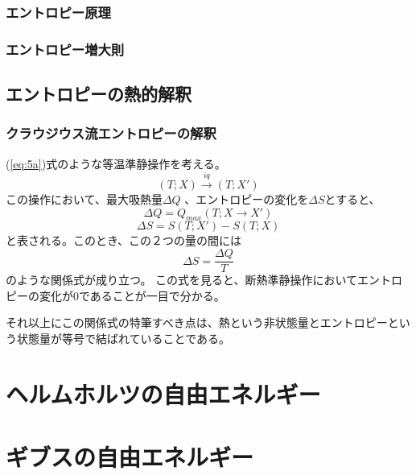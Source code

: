 \documentclass[a4paper]{jsreport}
\begin{document}
            \subsection*{エントロピー原理}
            \subsection*{エントロピー増大則}
        \section{エントロピーの熱的解釈}
            \subsection*{クラウジウス流エントロピーの解釈}
                (\ref{eq:5a})式のような等温準静操作を考える。
                \begin{equation} \label{eq:5a}
                    (T; X) \xrightarrow{iq} (T; X')
                \end{equation}
                この操作において、最大吸熱量$\Delta Q$ 、エントロピーの変化を$\Delta S$とすると、
                \begin{equation}
                    \Delta Q = Q_{max}(T; X \xrightarrow{} X')
                \end{equation}
                \begin{equation}
                    \Delta S = S(T; X') - S(T; X)
                \end{equation}
                と表される。このとき、この２つの量の間には
                \begin{equation}
                    \Delta S = \frac{\Delta Q}{T}
                \end{equation}
                のような関係式が成り立つ。
                この式を見ると、断熱準静操作においてエントロピーの変化が$0$であることが一目で分かる。\par
                それ以上にこの関係式の特筆すべき点は、熱という非状態量とエントロピーという状態量が等号で結ばれていることである。

    
    \chapter{ヘルムホルツの自由エネルギー}
    
    
    \chapter{ギブスの自由エネルギー}
        
\end{document}
